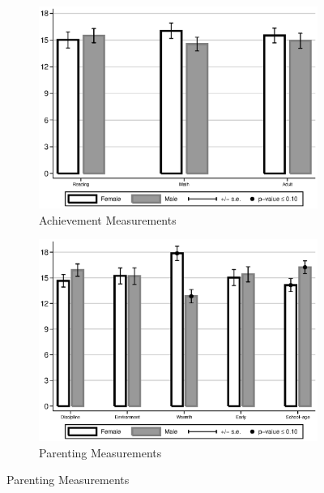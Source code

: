 \begin{figure}
\begin{center}
\begin{subfigure}[b]{0.49\textwidth}
	\caption{Achievement Measurements}
	\label{fig:intro-skills-plots-ach}
	\includegraphics[width=\textwidth]{../output/abccare-gdiff-ach}
\end{subfigure}
\begin{subfigure}[b]{0.49\textwidth}
	\caption{Parenting Measurements}
	\label{fig:intro-skills-plots-parenting}
	\includegraphics[width=\textwidth]{../output/abccare-gdiff-parenting}
\end{subfigure}
\end{center}
\raggedright \tiny

\end{figure}
